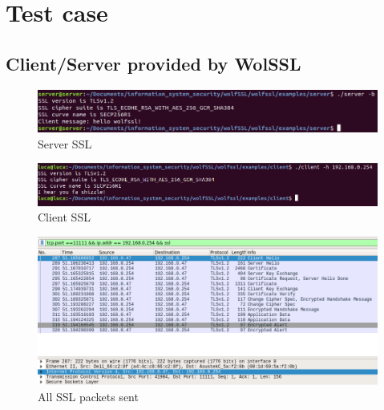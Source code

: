 \documentclass[a4paper,12pt]{report}
\begin{document}
\chapter{Test case}
\section{Client/Server provided by WolSSL}

\begin{figure}[H]
    \centering
    \includegraphics[scale=0.5]{test/examples/client-server/server.png}
    \caption{Server SSL}
    \label{fig:galaxy}
\end{figure}

\begin{figure}[H]
    \centering
    \includegraphics[scale=0.45]{test/examples/client-server/client.png}
    \caption{Client SSL}
    \label{fig:galaxy}
\end{figure}

\begin{figure}[H]
    \centering
    \includegraphics[scale=0.5]{test/examples/client-server/wireshark1.png}
    \caption{All SSL packets sent}
    \label{fig:galaxy}
\end{figure}
\end{document}

